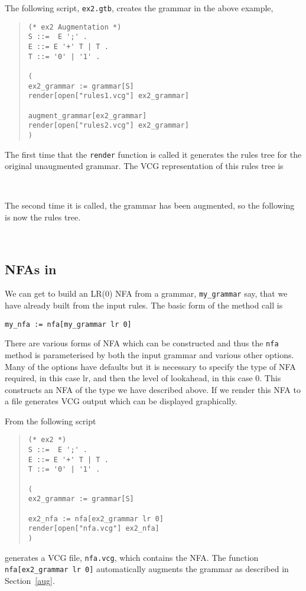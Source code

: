 The following script, \verb+ex2.gtb+, creates the grammar in the above
example, 
\begin{quote}
\begin{verbatim}
(* ex2 Augmentation *)
S ::=  E ';' .
E ::= E '+' T | T .
T ::= '0' | '1' .

(
ex2_grammar := grammar[S]
render[open["rules1.vcg"] ex2_grammar]

augment_grammar[ex2_grammar]
render[open["rules2.vcg"] ex2_grammar]
)
\end{verbatim}
\end{quote}
The first time that the \verb+render+ function is called it generates
the rules tree for the original unaugmented grammar. The VCG 
representation of this rules tree is
\begin{center}
\\[2mm]
\end{center}
The second time it is called, the grammar has been augmented, so the
following is now the rules tree.
\begin{center}
\\[2mm]
\end{center}


\subsection{NFAs in \gtb}\label{gtbNFA}

We can get \gtb to build an LR(0) NFA from a grammar, \verb+my_grammar+
say, that we have already built from the input rules. The basic form
of the method call is

\begin{center}\label{p_nfa}
\verb+my_nfa := nfa[my_grammar lr 0]+
\end{center}

There are various forms of NFA which can be constructed and thus the
\verb+nfa+ method is parameterised by both the input grammar and various other
options. Many of the options have defaults but it is necessary to
specify the type of NFA required, in this case lr, and then the level
of lookahead, in this case 0. This constructs an NFA of the type we
have described above. If we render this NFA to a file \gtb generates VCG
output which can be displayed graphically.

From the following script
\begin{quote}
\begin{verbatim}
(* ex2 *)
S ::=  E ';' .
E ::= E '+' T | T .
T ::= '0' | '1' .

(
ex2_grammar := grammar[S]  

ex2_nfa := nfa[ex2_grammar lr 0]
render[open["nfa.vcg"] ex2_nfa]
)
\end{verbatim}
\end{quote}
generates a VCG file, \verb+nfa.vcg+, which contains the NFA.
The function \verb+nfa[ex2_grammar lr 0]+ automatically augments the
grammar as described in Section~\ref{aug}.

